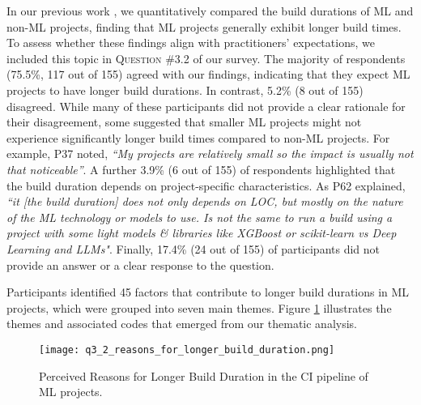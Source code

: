 In our previous work \citep{bernardo2024machine}, we quantitatively compared the build durations of ML and non-ML projects, finding that ML projects generally exhibit longer build times. To assess whether these findings align with practitioners' expectations, we included this topic in \textsc{Question \#3.2} of our survey.
The majority of respondents (75.5\%, 117 out of 155) agreed with our findings, indicating that they expect ML projects to have longer build durations. In contrast, 5.2\% (8 out of 155) disagreed. While many of these participants did not provide a clear rationale for their disagreement, some suggested that smaller ML projects might not experience significantly longer build times compared to non-ML projects. For example, P37 noted, \textit{``My projects are relatively small so the impact is usually not that noticeable''}.
A further 3.9\% (6 out of 155) of respondents highlighted that the build duration depends on project-specific characteristics. As P62 explained, \textit{``it [the build duration] does not only depends on LOC, but mostly on the nature of the ML technology or models to use. Is not the same to run a build using a project with some light models \& libraries like XGBoost or scikit-learn vs Deep Learning and LLMs"}. 
Finally, 17.4\% (24 out of 155) of participants did not provide an answer or a clear response to the question.


Participants identified 45 factors that contribute to longer build durations in ML projects, which were grouped into seven main themes. Figure \ref{fig:q3_2_reasons_for_longer_build_duration} illustrates the themes and associated codes that emerged from our thematic analysis.

\begin{figure}
	\centering
	\texttt{[image: q3\_2\_reasons\_for\_longer\_build\_duration.png]}
	\caption{Perceived Reasons for Longer Build Duration in the CI pipeline of ML projects.}
	\label{fig:q3_2_reasons_for_longer_build_duration}       %
\end{figure}

